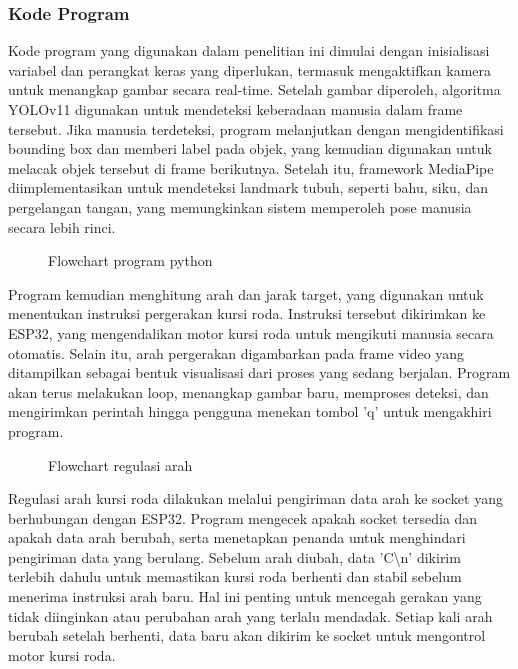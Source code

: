 \subsubsection{Kode Program}
\label{subsubsec:kode_program}

Kode program yang digunakan dalam penelitian ini dimulai dengan inisialisasi variabel dan perangkat keras yang diperlukan, termasuk mengaktifkan kamera untuk menangkap gambar secara real-time. Setelah gambar diperoleh, algoritma YOLOv11 digunakan untuk mendeteksi keberadaan manusia dalam frame tersebut. Jika manusia terdeteksi, program melanjutkan dengan mengidentifikasi bounding box dan memberi label pada objek, yang kemudian digunakan untuk melacak objek tersebut di frame berikutnya. Setelah itu, framework MediaPipe diimplementasikan untuk mendeteksi landmark tubuh, seperti bahu, siku, dan pergelangan tangan, yang memungkinkan sistem memperoleh pose manusia secara lebih rinci.

\begin{figure}[H]
  \centering
  \resizebox{1\linewidth}{!}{
    
  }
  \caption{Flowchart program python}
\end{figure}

Program kemudian menghitung arah dan jarak target, yang digunakan untuk menentukan instruksi pergerakan kursi roda. Instruksi tersebut dikirimkan ke ESP32, yang mengendalikan motor kursi roda untuk mengikuti manusia secara otomatis. Selain itu, arah pergerakan digambarkan pada frame video yang ditampilkan sebagai bentuk visualisasi dari proses yang sedang berjalan. Program akan terus melakukan loop, menangkap gambar baru, memproses deteksi, dan mengirimkan perintah hingga pengguna menekan tombol 'q' untuk mengakhiri program.


\begin{figure}[H]
  \centering
  \resizebox{.7\linewidth}{!}{
    
  }
  \caption{Flowchart regulasi arah}
\end{figure}

Regulasi arah kursi roda dilakukan melalui pengiriman data arah ke socket yang berhubungan dengan ESP32. Program mengecek apakah socket tersedia dan apakah data arah berubah, serta menetapkan penanda untuk menghindari pengiriman data yang berulang. Sebelum arah diubah, data 'C\textbackslash n' dikirim terlebih dahulu untuk memastikan kursi roda berhenti dan stabil sebelum menerima instruksi arah baru. Hal ini penting untuk mencegah gerakan yang tidak diinginkan atau perubahan arah yang terlalu mendadak. Setiap kali arah berubah setelah berhenti, data baru akan dikirim ke socket untuk mengontrol motor kursi roda.

